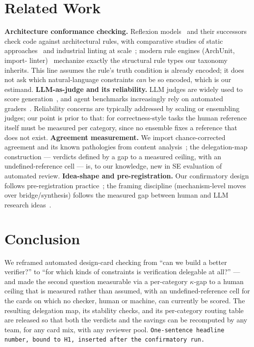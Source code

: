 \documentclass[conference]{IEEEtran}
\newcommand{\ph}[1]{\colorbox{yellow!35}{\texttt{\footnotesize #1}}}
\begin{document}
\section{Related Work}\label{sec:related}
\textbf{Architecture conformance checking.} Reflexion
models~\cite{murphy1995reflexion} and their successors check code against
architectural rules, with comparative studies of static
approaches~\cite{knodel2007comparison,passos2010static} and industrial linting
at scale~\cite{sadowski2018lessons}; modern rule engines (ArchUnit, import-%
linter)~\cite{archunit,importlinter} mechanize exactly the structural rule
types our taxonomy inherits. This line assumes the rule's truth condition is
already encoded; it does not ask which natural-language constraints \emph{can}
be so encoded, which is our estimand.
\textbf{LLM-as-judge and its reliability.} LLM judges are widely used to score
generation~\cite{zheng2023judging}, and agent benchmarks increasingly rely on
automated graders~\cite{jimenez2024swebench,yang2024sweagent}. Reliability
concerns are typically addressed by scaling or ensembling judges; our point is
prior to that: for correctness-style tasks the human reference itself must be
measured per category, since no ensemble fixes a reference that does not exist.
\textbf{Agreement measurement.} We import chance-corrected agreement and its
known pathologies from content
analysis~\cite{cohen1960,fleiss1971,landis1977,artstein2008inter,mchugh2012kappa};
the delegation-map construction --- verdicts defined by a gap to a measured
ceiling, with an undefined-reference cell --- is, to our knowledge, new in
SE evaluation of automated review.
\textbf{Idea-shape and pre-registration.} Our confirmatory design follows
pre-registration practice~\cite{nosek2018preregistration}; the framing
discipline (mechanism-level moves over bridge/synthesis) follows the measured
gap between human and LLM research ideas~\cite{chen2026measuring}.

\section{Conclusion}\label{sec:conclusion}
We reframed automated design-card checking from ``can we build a better
verifier?'' to ``for which kinds of constraints is verification delegable at
all?'' --- and made the second question measurable via a per-category
$\kappa$-gap to a human ceiling that is measured rather than assumed, with an
undefined-reference cell for the cards on which no checker, human or machine,
can currently be scored. The resulting delegation map, its stability checks,
and its per-category routing table are released so that both the verdicts and
the savings can be recomputed by any team, for any card mix, with any reviewer
pool. \ph{One-sentence headline number, bound to H1, inserted after the
confirmatory run.}
\end{document}
